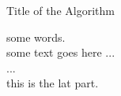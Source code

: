\documentclass[UTF8,a4paper,10pt, twocolumn]{ctexart}
\begin{document}
	\begin{algorithm}
		\caption{Title of the Algorithm}
		\label{algo:ref}
		\begin{algorithmic}[1]
			\REQUIRE some words.  %
			\ENSURE ~\\           %
			some text goes here ... \\
			\STATE ... \\  %
			\ENDWHILE
			\RETURN this is the lat part.  %
		\end{algorithmic}
	\end{algorithm}
\end{document}
